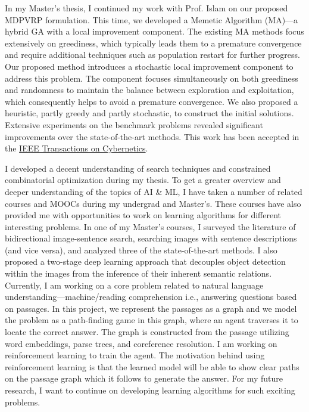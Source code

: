 \documentclass[12pt]{article}
\begin{document}
In my Master's thesis, I continued my work with Prof. Islam on our proposed MDPVRP formulation. This time, we developed a Memetic Algorithm (MA)---a hybrid GA with a local improvement component. The existing MA methods focus extensively on greediness, which typically leads them to a premature convergence and require additional techniques such as population restart for further progress. Our proposed method introduces a stochastic local improvement component to address this problem. The component focuses simultaneously on both greediness and randomness to maintain the balance between exploration and exploitation, which consequently helps to avoid a premature convergence. We also proposed a heuristic, partly greedy and partly stochastic, to construct the initial solutions. Extensive experiments on the benchmark problems revealed significant improvements over the state-of-the-art methods. This work has been accepted in the \href{http://ieeexplore.ieee.org/document/7835722/}{IEEE Transactions on Cybernetics}. 


I developed a decent understanding of search techniques and constrained combinatorial optimization during my thesis. To get a greater overview and deeper understanding of the topics of AI \& ML, I have taken a number of related courses and MOOCs during my undergrad and Master's. These courses have also provided me with opportunities to work on learning algorithms for different interesting problems. In one of my Master's courses, I surveyed the literature of bidirectional image-sentence search, searching images with sentence descriptions (and vice versa), and analyzed three of the state-of-the-art methods. I also proposed a two-stage deep learning approach that decouples object detection within the images from the inference of their inherent semantic relations. Currently, I am working on a core problem related to natural language understanding---machine/reading comprehension i.e., answering questions based on passages. In this project, we represent the passages as a graph and we model the problem as a path-finding game in this graph, where an agent traverses it to locate the correct answer. The graph is constructed from the passage utilizing word embeddings, parse trees, and coreference resolution. I am working on reinforcement learning to train the agent. The motivation behind using reinforcement learning is that the learned model will be able to show clear paths on the passage graph which it follows to generate the answer. For my future research, I want to continue on developing learning algorithms for such exciting problems.   
\end{document}
